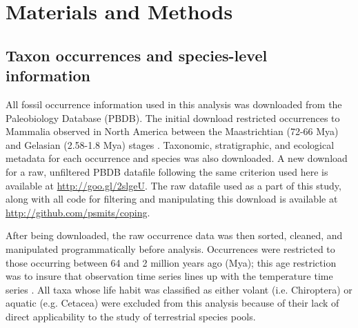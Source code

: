 \documentclass[12pt,letterpaper]{article}
\begin{document}
\section*{Materials and Methods}

\subsection*{Taxon occurrences and species-level information}
All fossil occurrence information used in this analysis was downloaded from the Paleobiology Database (PBDB). The initial download restricted occurrences to Mammalia observed in North America between the Maastrichtian (72-66 Mya) and Gelasian (2.58-1.8 Mya) stages \citep{Cohen2015}. Taxonomic, stratigraphic, and ecological metadata for each occurrence and species was also downloaded. A new download for a raw, unfiltered PBDB datafile following the same criterion used here is available at \url{http://goo.gl/2slgeU}. The raw datafile used as a part of this study, along with all code for filtering and manipulating this download is available at \url{http://github.com/psmits/coping}.

After being downloaded, the raw occurrence data was then sorted, cleaned, and manipulated programmatically before analysis. Occurrences were restricted to those occurring between 64 and 2 million years ago (Mya); this age restriction was to insure that observation time series lines up with the temperature time series \citep{Cramer2011}. All taxa whose life habit was classified as either volant (i.e. Chiroptera) or aquatic (e.g. Cetacea) were excluded from this analysis because of their lack of direct applicability to the study of terrestrial species pools.
\end{document}
